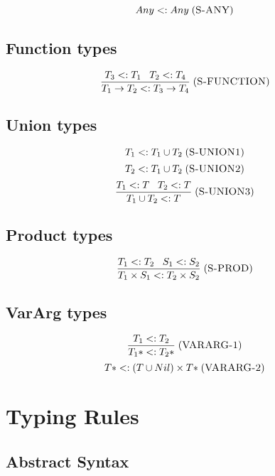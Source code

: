 \documentclass[12pt]{article}
\newcommand{\mylabel}[1]{\; (\textsc{#1})}
\newcommand{\subtype}{<:}
\begin{document}
\[
Any \subtype Any
\mylabel{S-ANY}
\]

\subsection{Function types}

\[
\frac{T_{3} \subtype T_{1} \;\;\; T_{2} \subtype T_{4}}
     {T_{1} \rightarrow T_{2} \subtype T_{3} \rightarrow T_{4}}
\mylabel{S-FUNCTION}
\]

\subsection{Union types}

\[
T_{1} \subtype T_{1} \cup T_{2}
\mylabel{S-UNION1}
\]
\[
T_{2} \subtype T_{1} \cup T_{2}
\mylabel{S-UNION2}
\]
\[
\frac{T_{1} \subtype T \;\;\; T_{2} \subtype T}
     {T_{1} \cup T_{2} \subtype T}
\mylabel{S-UNION3}
\]

\subsection{Product types}

\[
\frac{T_{1} \subtype T_{2} \;\;\; S_{1} \subtype S_{2}}
     {T_{1} \times S_{1} \subtype T_{2} \times S_{2}}
\mylabel{S-PROD}
\]

\subsection{VarArg types}

\[
\frac{T_{1} \subtype T_{2}}
     {T_{1}* \subtype T_{2}*}
\mylabel{VARARG-1}
\]
\[
{T*} \subtype (T \cup Nil) \times {T*}
\mylabel{VARARG-2}
\]

\section{Typing Rules}

\subsection{Abstract Syntax}
\end{document}
